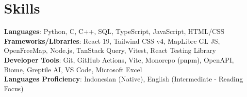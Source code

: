 \documentclass[letterpaper,11pt]{article}
\begin{document}
\section{Skills}
 \begin{itemize}[leftmargin=0.15in, label={}]
    \small{\item{
     \textbf{Languages}{: Python, C, C++, SQL, TypeScript, JavaScript, HTML/CSS} \\
     \textbf{Frameworks/Libraries}{: React 19, Tailwind CSS v4, MapLibre GL JS, OpenFreeMap, Node.js, TanStack Query, Vitest, React Testing Library} \\
     \textbf{Developer Tools}{: Git, GitHub Actions, Vite, Monorepo (pnpm), OpenAPI, Biome, Greptile AI, VS Code, Microsoft Excel} \\
     \textbf{Languages Proficiency}{: Indonesian (Native), English (Intermediate - Reading Focus)}
    }}
 \end{itemize}

\end{document}
